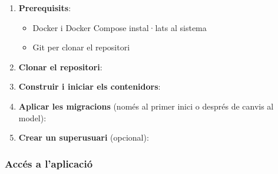 \begin{enumerate}
\def\labelenumi{\arabic{enumi}.}
\item
  \textbf{Prerequisits}:

  \begin{itemize}
  \tightlist
  \item
    Docker i Docker Compose instal·lats al sistema
  \item
    Git per clonar el repositori
  \end{itemize}
\item
  \textbf{Clonar el repositori}:

\begin{Shaded}
\begin{Highlighting}[]
\end{Highlighting}
\end{Shaded}
\item
  \textbf{Construir i iniciar els contenidors}:

\begin{Shaded}
\begin{Highlighting}[]
\end{Highlighting}
\end{Shaded}
\item
  \textbf{Aplicar les migracions} (només al primer inici o després de
  canvis al model):

\begin{Shaded}
\begin{Highlighting}[]
\end{Highlighting}
\end{Shaded}
\item
  \textbf{Crear un superusuari} (opcional):

\begin{Shaded}
\begin{Highlighting}[]
\end{Highlighting}
\end{Shaded}
\end{enumerate}

\hypertarget{accuxe9s-a-laplicaciuxf3}{%
\subsubsection{Accés a l'aplicació}\label{accuxe9s-a-laplicaciuxf3}}

